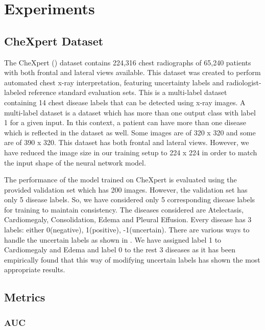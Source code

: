 \chapter{Experiments}
\ifpdf
    \graphicspath{{Chapter3/Chapter3Figs/PNG/}{Chapter3/Chapter3Figs/PDF/}{Chapter3/Chapter3Figs/}}
\else
    \graphicspath{{Chapter3/Chapter3Figs/EPS/}{Chapter3/Chapter3Figs/}}
\fi

\section{CheXpert Dataset}

The CheXpert (\cite{irvin2019chexpert}) dataset contains 224,316 chest radiographs of 65,240 patients with both frontal and lateral views available. This dataset was created to perform automated chest x-ray interpretation, featuring uncertainty labels and radiologist-labeled reference standard evaluation sets. This is a multi-label dataset containing 14 chest disease labels that can be detected using x-ray images. A multi-label dataset is a dataset which has more than one output class with label 1 for a given input. In this context, a patient can have more than one disease which is reflected in the dataset as well. Some images are of 320 x 320 and some are of 390 x 320. This dataset has both frontal and lateral views. However, we have reduced the image size in our training setup to 224 x 224 in order to match the input shape of the neural network model.

The performance of the model trained on CheXpert is evaluated using the provided validation set which has 200 images. However, the validation set has only 5 disease labels. So, we have considered only 5 corresponding disease labels for training to maintain consistency. The diseases considered are  Atelectasis, Cardiomegaly, Consolidation, Edema and Pleural Effusion. Every disease has 3 labels: either 0(negative), 1(positive), -1(uncertain). There are various ways to handle the uncertain labels as shown in \cite{irvin2019chexpert}. We have assigned label 1 to Cardiomegaly and Edema and label 0 to the rest 3 diseases as it has been empirically found that this way of modifying uncertain labels has shown the most appropriate results. 

\section{Metrics}

\subsection{AUC}

